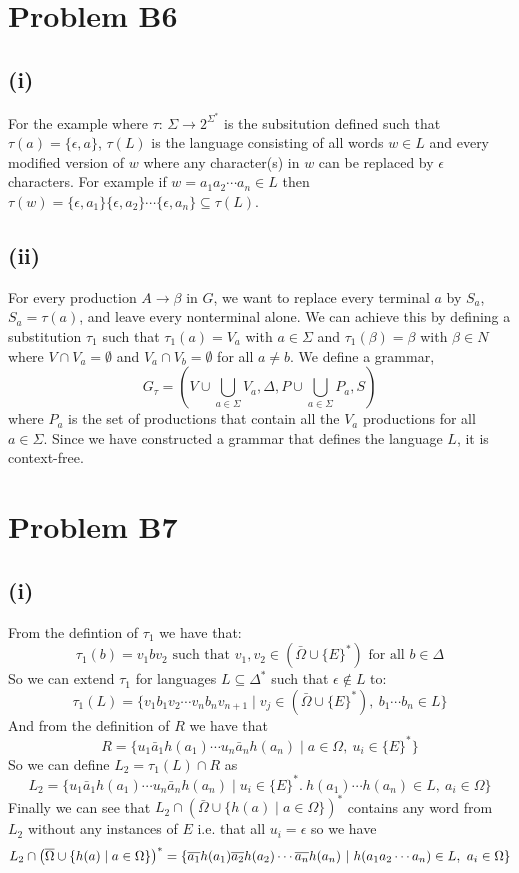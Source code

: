 \documentclass[12pt]{article}
\begin{document}
\section*{Problem B6}
\subsection*{(i)} For the example where
$\tau$: $\Sigma \rightarrow 2^{\Sigma^*}$ is the subsitution defined such
that $\tau(a) = \{\epsilon, a\}$, $\tau(L)$ is the language consisting of all
words $w \in L$ and every modified version of $w$ where any character(s) in $w$
can be replaced by $\epsilon$ characters. For example if
$w=a_1a_2\cdots a_n \in L$ then
$\tau(w) = \{\epsilon, a_1\}\{\epsilon, a_2\}\cdots \{\epsilon, a_n\}
\subseteq \tau(L)$.

\subsection*{(ii)}
For every production $A \rightarrow \beta$ in $G$, we want to replace every
terminal $a$ by $S_a$, $S_a = \tau(a)$, and leave every nonterminal alone.
We can achieve this by defining a substitution $\tau_1$ such that
$\tau_1(a)=V_a$ with $a \in \Sigma$ and $\tau_1(\beta)=\beta$ with
$\beta \in N$ where $V \cap V_a = \emptyset$ and $V_a \cap V_b = \emptyset$
for all $a \neq b$. We define a grammar,
$$G_{\tau} = (V \cup \bigcup_{a \in \Sigma} V_a, \Delta,
P \cup \bigcup_{a \in \Sigma} P_a, S)$$
where $P_a$ is the set of productions that contain all the
$V_a$ productions for all $a \in \Sigma$. Since we have constructed a grammar
that defines the language $L$, it is context-free.

\section*{Problem B7}
\subsection*{(i)} From the defintion of $\tau_1$ we have that:
$$\tau_1(b)= v_1bv_2 \text{ such that } v_1,v_2 \in (\bar\Omega \cup \{E\}^*)
\text{ for all } b\in \Delta$$
So we can extend $\tau_1$ for languages $L \subseteq \Delta^*$ such that
$\epsilon \not\in L$ to:
$$\tau_1(L) = \{v_1b_1v_2\cdots v_nb_nv_{n+1} \mid
v_j \in (\bar\Omega \cup \{E\}^*),\ b_1\cdots b_n \in L\}$$
And from the definition of $R$ we have that
$$ R = \{u_1\bar a_1h(a_1)\cdots u_n\bar a_nh(a_n)
\mid a\in \Omega,\ u_i\in \{E\}^*\}$$
So we can define $L_2 = \tau_1(L) \cap R$ as
$$L_2 = \{u_1\bar a_1h(a_1)\cdots u_n\bar a_nh(a_n)
\mid u_i \in \{E\}^*.\ h(a_1)\cdots h(a_n) \in L,\ a_i\in \Omega\}$$
Finally we can see that $L_2 \cap (\bar\Omega\cup\{h(a) \mid a\in \Omega\})^*$
contains any word from $L_2$ without any instances of $E$ i.e. that all
$u_i = \epsilon$ so we have
$$L_2\cap \left(\overline{\Omega}\cup \{h(a) \mid a\in\Omega\}\right)^*
=\{\overline{a_1}h(a_1) \overline{a_2}h(a_2)\cdots \overline{a_n}h(a_n)\ |\
h(a_1a_2\cdots a_n)\in L,\ a_i\in \Omega\}$$
\end{document}
